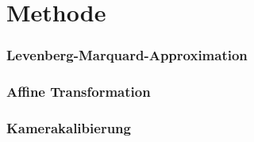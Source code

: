 \section{Methode}
\subsubsection{Levenberg-Marquard-Approximation}
\subsubsection{Affine Transformation}
\subsubsection{Kamerakalibierung}


\newpage